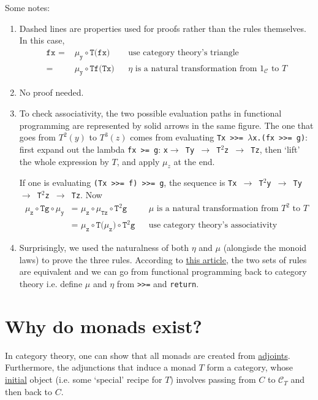 \documentclass[11pt]{article}
\newcommand{\Cc}{\mathcal{C}}
\begin{document}
Some notes:
\begin{enumerate}
\item Dashed lines are properties used for proofs rather than the rules themselves. In this case,
\begin{align*}
    \texttt{fx = }&\mu_{\texttt{y}} \circ\texttt{T(fx)} && \text{use category theory's triangle} \\
    \texttt{= }& \mu_{\texttt{y}} \circ\texttt{Tf(Tx)} && \text{$\eta$ is a natural transformation from $1_\Cc$ to $T$}
\end{align*}
\item No proof needed.
\item To check associativity, the two possible evaluation paths in functional programming are represented by solid arrows in the same figure.
The one that goes from $T^2(y)$ to $T^3(z)$ comes from evaluating \texttt{Tx >>= $\lambda$x.(fx >>= g)}: first expand out the lambda \texttt{fx >= g}: \texttt{x$\rightarrow$ Ty $\rightarrow$ T$^2$z $\rightarrow$ Tz}, then `lift' the whole expression by $T$, and apply $\mu_z$ at the end. 

If one is evaluating \texttt{(Tx >>= f) >>= g}, the sequence is \texttt{Tx $\rightarrow$ T$^2$y $\rightarrow$ Ty $\rightarrow$ T$^2$z $\rightarrow$ Tz}. Now
\begin{align*}
    \mu_{\texttt{z}}\circ \texttt{Tg} \circ \mu_{\texttt{y}} & \texttt{= }\mu_{\texttt{z}} \circ \mu_{\texttt{Tz}} \circ \texttt{T}^2\texttt{g} && \text{$\mu$ is a natural transformation from $T^2$ to $T$}\\
    & \texttt{= } \mu_{\texttt{z}} \circ \texttt{T(}\mu_{\texttt{z}}\texttt{)} \circ \texttt{T}^2\texttt{g} && \text{use category theory's associativity}
\end{align*}

\item Surprisingly, we used the naturalness of both $\eta$ and $\mu$ (alongisde the monoid laws) to prove the three rules. According to \href{https://en.wikibooks.org/wiki/Haskell/Category_theory#Application_to_do-blocks}{this article}, the two sets of rules are equivalent and we can go from functional programming back to category theory i.e. define $\mu$ and $\eta$ from \texttt{>>=} and \texttt{return}.
\end{enumerate}

\section{Why do monads exist?}\label{context}
In category theory, one can show that all monads are created from \href{https://en.wikipedia.org/wiki/Adjoint_functors}{adjoints}. Furthermore, the adjunctions that induce a monad $T$ form a category, whose \href{https://en.wikipedia.org/wiki/Initial_and_terminal_objects}{initial} object (i.e. some `special' recipe for $T$) involves passing from $C$ to $\Cc_T$ and then back to $C$.
\end{document}

